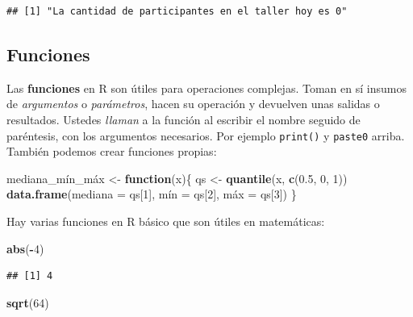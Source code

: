 \documentclass[
]{article}
\newenvironment{Shaded}{\begin{snugshade}}{\end{snugshade}}
\newcommand{\AttributeTok}[1]{\textcolor[rgb]{0.13,0.29,0.53}{#1}}
\newcommand{\ControlFlowTok}[1]{\textcolor[rgb]{0.13,0.29,0.53}{\textbf{#1}}}
\newcommand{\DecValTok}[1]{\textcolor[rgb]{0.00,0.00,0.81}{#1}}
\newcommand{\FloatTok}[1]{\textcolor[rgb]{0.00,0.00,0.81}{#1}}
\newcommand{\FunctionTok}[1]{\textcolor[rgb]{0.13,0.29,0.53}{\textbf{#1}}}
\newcommand{\NormalTok}[1]{#1}
\newcommand{\OtherTok}[1]{\textcolor[rgb]{0.56,0.35,0.01}{#1}}
\newcommand{\SpecialCharTok}[1]{\textcolor[rgb]{0.81,0.36,0.00}{\textbf{#1}}}
\begin{document}
\begin{verbatim}
## [1] "La cantidad de participantes en el taller hoy es 0"
\end{verbatim}

\subsection{Funciones}\label{funciones}

Las \textbf{funciones} en R son útiles para operaciones complejas. Toman
en sí insumos de \emph{argumentos} o \emph{parámetros}, hacen su
operación y devuelven unas salidas o resultados. Ustedes \emph{llaman} a
la función al escribir el nombre seguido de paréntesis, con los
argumentos necesarios. Por ejemplo \texttt{print()} y \texttt{paste0}
arriba. También podemos crear funciones propias:

\begin{Shaded}
\begin{Highlighting}[]
\NormalTok{mediana\_mín\_máx }\OtherTok{\textless{}{-}} \ControlFlowTok{function}\NormalTok{(x)\{}
\NormalTok{  qs }\OtherTok{\textless{}{-}} \FunctionTok{quantile}\NormalTok{(x, }\FunctionTok{c}\NormalTok{(}\FloatTok{0.5}\NormalTok{, }\DecValTok{0}\NormalTok{, }\DecValTok{1}\NormalTok{))}
  \FunctionTok{data.frame}\NormalTok{(}\AttributeTok{mediana =}\NormalTok{ qs[}\DecValTok{1}\NormalTok{], mín }\OtherTok{=}\NormalTok{ qs[}\DecValTok{2}\NormalTok{], máx }\OtherTok{=}\NormalTok{ qs[}\DecValTok{3}\NormalTok{])}
\NormalTok{\}}
\end{Highlighting}
\end{Shaded}

Hay varias funciones en R básico que son útiles en matemáticas:

\begin{Shaded}
\begin{Highlighting}[]
\FunctionTok{abs}\NormalTok{(}\SpecialCharTok{{-}}\DecValTok{4}\NormalTok{)}
\end{Highlighting}
\end{Shaded}

\begin{verbatim}
## [1] 4
\end{verbatim}

\begin{Shaded}
\begin{Highlighting}[]
\FunctionTok{sqrt}\NormalTok{(}\DecValTok{64}\NormalTok{)}
\end{Highlighting}
\end{Shaded}
\end{document}
